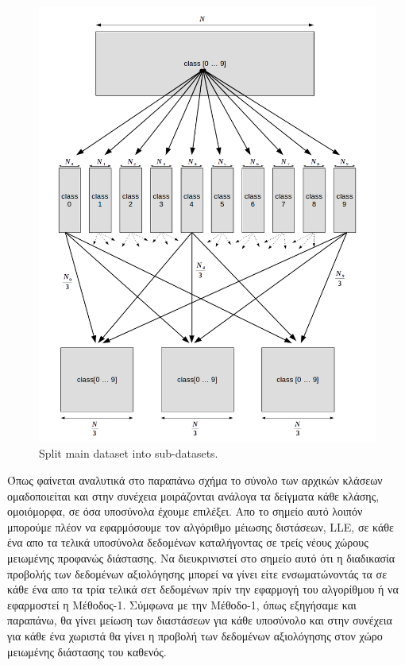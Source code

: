 \newpage
\begin{figure}[t!]
\centering
\includegraphics[scale=0.8]{figs/6.png}
\newline
\caption{ \textlatin{Split main dataset into sub-datasets}.} 
\end{figure}
\newpage
\par
Όπως φαίνεται αναλυτικά στο παραπάνω σχήμα το σύνολο των αρχικών κλάσεων ομαδοποιείται και στην συνέχεια μοιράζονται ανάλογα τα δείγματα κάθε κλάσης, ομοιόμορφα, σε όσα υποσύνολα έχουμε επιλέξει. Απο το σημείο αυτό λοιπόν μπορούμε πλέον να εφαρμόσουμε τον αλγόριθμο μέιωσης διστάσεων, \textlatin{LLE}, σε κάθε ένα απο τα τελικά υποσύνολα δεδομένων καταλήγοντας σε τρείς νέους χώρους μειωμένης προφανώς διάστασης. Να διευκρινιστεί στο σημείο αυτό ότι η διαδικασία προβολής των δεδομένων αξιολόγησης μπορεί να γίνει είτε ενσωματώνοντάς τα σε κάθε ένα απο τα τρία τελικά σετ δεδομένων πρίν την εφαρμογή του αλγορίθμου ή να εφαρμοστεί η Μέθοδος-1. Σύμφωνα με την Μέθοδο-1, όπως εξηγήσαμε και παραπάνω, θα γίνει μείωση των διαστάσεων για κάθε υποσύνολο και στην συνέχεια για κάθε ένα χωριστά θα γίνει η προβολή των δεδομένων αξιολόγησης στον χώρο μειωμένης διάστασης του καθενός. 
